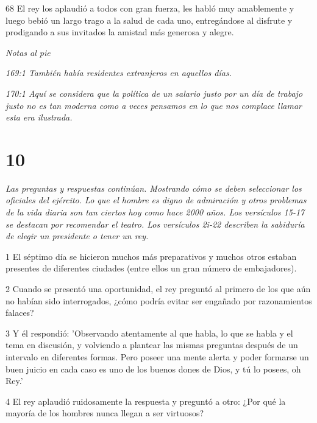 \par 68 El rey los aplaudió a todos con gran fuerza, les habló muy amablemente y luego bebió un largo trago a la salud de cada uno, entregándose al disfrute y prodigando a sus invitados la amistad más generosa y alegre.

\par \textit{Notas al pie}

\par \textit{169:1 También había residentes extranjeros en aquellos días.}

\par \textit{170:1 Aquí se considera que la política de un salario justo por un día de trabajo justo no es tan moderna como a veces pensamos en lo que nos complace llamar esta era ilustrada.}

\chapter{10}

\par \textit{Las preguntas y respuestas continúan. Mostrando cómo se deben seleccionar los oficiales del ejército. Lo que el hombre es digno de admiración y otros problemas de la vida diaria son tan ciertos hoy como hace 2000 años. Los versículos 15-17 se destacan por recomendar el teatro. Los versículos 2i-22 describen la sabiduría de elegir un presidente o tener un rey.}

\par 1 El séptimo día se hicieron muchos más preparativos y muchos otros estaban presentes de diferentes ciudades (entre ellos un gran número de embajadores).

\par 2 Cuando se presentó una oportunidad, el rey preguntó al primero de los que aún no habían sido interrogados, ¿cómo podría evitar ser engañado por razonamientos falaces?

\par 3 Y él respondió: 'Observando atentamente al que habla, lo que se habla y el tema en discusión, y volviendo a plantear las mismas preguntas después de un intervalo en diferentes formas. Pero poseer una mente alerta y poder formarse un buen juicio en cada caso es uno de los buenos dones de Dios, y tú lo posees, oh Rey.'

\par 4 El rey aplaudió ruidosamente la respuesta y preguntó a otro: ¿Por qué la mayoría de los hombres nunca llegan a ser virtuosos?


